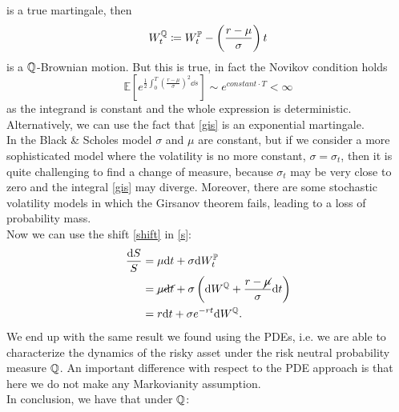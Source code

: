 is a true martingale, then
\begin{equation}\label{shift}
    W^{\mathbb{Q}}_t \coloneqq W_t^{\mathbb{P}} - \left(\frac{r-\mu}{\sigma}\right)t
\end{equation}
is a $\mathbb{Q}$-Brownian motion. But this is true, in fact the Novikov condition holds
\begin{equation}
    \mathbb{E}\left[e^{\frac{1}{2}\int^T_0\left(\frac{r-\mu}{\sigma}\right)^2\dd s}\right] \sim e^{constant\cdot T} < \infty
\end{equation}
as the integrand is constant and the whole expression is deterministic. Alternatively, we can use the fact that \eqref{gis} is an exponential martingale. \\
In the Black \& Scholes model $\sigma$ and $\mu$ are constant, but if we consider a more sophisticated model where the volatility is no more constant, $\sigma=\sigma_t$, then it is quite challenging to find a change of measure, because $\sigma_t$ may be very close to zero and the integral \eqref{gis} may diverge. Moreover, there are some stochastic volatility models in which the Girsanov theorem fails, leading to a loss of probability mass. \\
Now we can use the shift \eqref{shift} in \eqref{s}:
\begin{align}
    \notag \frac{\dd S}{S} &= \mu \dd t + \sigma \dd W_t^{\mathbb{P}}\\
    &=
    \cancel{\mu \dd t} + \sigma \left(\dd W^{\mathbb{Q}} + \frac{r-\cancel{\mu}}{\sigma}\dd t\right) \\
    &=
    r\dd t + \sigma e^{-rt}\dd W^{\mathbb{Q}}.
\end{align}
We end up with the same result we found using the PDEs, i.e. we are able to characterize the dynamics of the risky asset under the risk neutral probability measure $\mathbb{Q}$. An important difference with respect to the PDE approach is that here we do not make any Markovianity assumption.\\
In conclusion, we have that under $\mathbb{Q}$:
